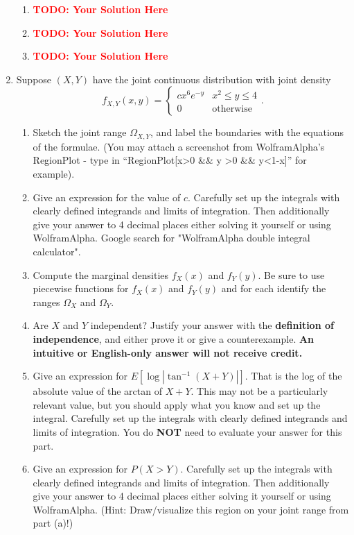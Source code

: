 \documentclass[12pt]{article}
\def\todo#1{\textcolor{red}{\textbf{#1}}}
\renewcommand{\|}{\mid}
\begin{document}
\begin{enumerate}
\begin{tcolorbox}
\begin{enumerate}
\item \todo{TODO: Your Solution Here}
\item \todo{TODO: Your Solution Here}
\item \todo{TODO: Your Solution Here}
\end{enumerate}
\end{tcolorbox}

\item Suppose $(X,Y)$ have the joint continuous distribution with joint density
$$f_{X,Y}(x,y)=\begin{cases}
cx^6e^{-y} & x^2\le y\le 4\\
0 & \text{otherwise}
\end{cases}.$$
\begin{enumerate}
    \item Sketch the joint range $\Omega_{X,Y}$, and label the boundaries with the equations of the formulae. (You may attach a screenshot from WolframAlpha's RegionPlot - type in ``RegionPlot[x>0 \&\& y >0  \&\& y<1-x]'' for example).
    \item Give an expression for the value of $c$. Carefully set up the integrals with clearly defined integrands and limits of integration. Then additionally give your answer to 4 decimal places either solving it yourself or using WolframAlpha. Google search for "WolframAlpha double integral calculator".
    \item Compute the marginal densities $f_X(x)$ and $f_Y(y)$. Be sure to use piecewise functions for $f_X(x)$ and $f_Y(y)$ and for each identify the ranges $\Omega_X$ and $\Omega_Y$.
    \item Are $X$ and $Y$ independent? Justify your answer with the \textbf{definition of independence}, and either prove it or give a counterexample. \textbf{An intuitive or English-only answer will not receive credit.} 
    \item Give an expression for $E[\log{|\tan^{-1}{(X+Y)}|}]$.  That is the log of the absolute value of the arctan of $X + Y$. This may not be a particularly relevant value, but you should apply what you know and set up the integral. Carefully set up the integrals with clearly defined integrands and limits of integration. You do \textbf{NOT} need to evaluate your answer for this part.
    \item Give an expression for $P(X>Y)$. Carefully set up the integrals with clearly defined integrands and limits of integration. Then additionally give your answer to 4 decimal places either solving it yourself or using WolframAlpha. (Hint: Draw/visualize this region on your joint range from part (a)!)
\end{enumerate}


\end{enumerate}
\end{document}
